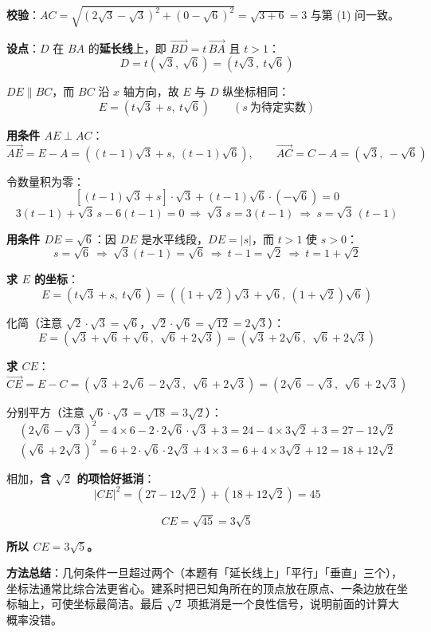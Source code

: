 \textbf{校验}：$AC=\sqrt{\left(2\sqrt3-\sqrt3\right)^2+\left(0-\sqrt6\right)^2}=\sqrt{3+6}=3$  与第 (1) 问一致。

\textbf{设点}：$D$ 在 $BA$ 的\textbf{延长线}上，即 $\overrightarrow{BD}=t\,\overrightarrow{BA}$ 且 $t>1$：
\[D=t\left(\sqrt3,\ \sqrt6\right)=\left(t\sqrt3,\ t\sqrt6\right)\]

$DE\parallel BC$，而 $BC$ 沿 $x$ 轴方向，故 $E$ 与 $D$ 纵坐标相同：
\[E=\left(t\sqrt3+s,\ t\sqrt6\right)\qquad(s\ \text{为待定实数})\]

\textbf{用条件 $AE\perp AC$}：
\[\overrightarrow{AE}=E-A=\left((t-1)\sqrt3+s,\ (t-1)\sqrt6\right),\qquad \overrightarrow{AC}=C-A=\left(\sqrt3,\ -\sqrt6\right)\]

令数量积为零：
\[\left[(t-1)\sqrt3+s\right]\cdot\sqrt3+(t-1)\sqrt6\cdot\left(-\sqrt6\right)=0\]
\[3(t-1)+\sqrt3\,s-6(t-1)=0\ \Longrightarrow\ \sqrt3\,s=3(t-1)\ \Longrightarrow\ s=\sqrt3\,(t-1)\]

\textbf{用条件 $DE=\sqrt6$}：因 $DE$ 是水平线段，$DE=|s|$，而 $t>1$ 使 $s>0$：
\[s=\sqrt6\ \Longrightarrow\ \sqrt3(t-1)=\sqrt6\ \Longrightarrow\ t-1=\sqrt2\ \Longrightarrow\ t=1+\sqrt2\]

\textbf{求 $E$ 的坐标}：
\[E=\left(t\sqrt3+s,\ t\sqrt6\right)=\left(\left(1+\sqrt2\right)\sqrt3+\sqrt6,\ \left(1+\sqrt2\right)\sqrt6\right)\]

化简（注意 $\sqrt2\cdot\sqrt3=\sqrt6$，$\sqrt2\cdot\sqrt6=\sqrt{12}=2\sqrt3$）：
\[E=\left(\sqrt3+\sqrt6+\sqrt6,\ \ \sqrt6+2\sqrt3\right)=\left(\sqrt3+2\sqrt6,\ \ \sqrt6+2\sqrt3\right)\]

\textbf{求 $CE$}：
\[\overrightarrow{CE}=E-C=\left(\sqrt3+2\sqrt6-2\sqrt3,\ \ \sqrt6+2\sqrt3\right)=\left(2\sqrt6-\sqrt3,\ \ \sqrt6+2\sqrt3\right)\]

分别平方（注意 $\sqrt6\cdot\sqrt3=\sqrt{18}=3\sqrt2$）：
\[\left(2\sqrt6-\sqrt3\right)^2=4\times6-2\cdot2\sqrt6\cdot\sqrt3+3=24-4\times3\sqrt2+3=27-12\sqrt2\]
\[\left(\sqrt6+2\sqrt3\right)^2=6+2\cdot\sqrt6\cdot2\sqrt3+4\times3=6+4\times3\sqrt2+12=18+12\sqrt2\]

相加，\textbf{含 $\sqrt2$ 的项恰好抵消}：
\[|CE|^2=\left(27-12\sqrt2\right)+\left(18+12\sqrt2\right)=45\]

\[CE=\sqrt{45}=3\sqrt5\]

\textbf{所以 $CE=3\sqrt5$。}

\begin{gktip}
\textbf{方法总结}：几何条件一旦超过两个（本题有「延长线上」「平行」「垂直」三个），坐标法通常比综合法更省心。建系时把已知角所在的顶点放在原点、一条边放在坐标轴上，可使坐标最简洁。最后 $\sqrt2$ 项抵消是一个良性信号，说明前面的计算大概率没错。
\end{gktip}


